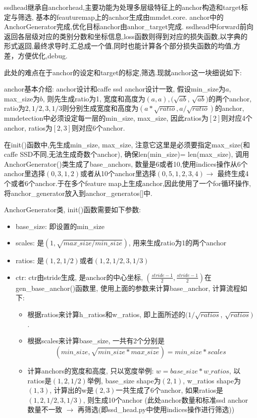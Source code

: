 \documentclass[UTF8]{ctexart}
\begin{document}
ssdhead继承自anchorhead,主要功能为处理多层级特征上的anchor构造和target标定与筛选,
基本的feauturemap上的acnhor生成由mmdet.core.
anchor中的AnchorGenerator完成,优化目标anchor由anhor\_target完成.
ssdhead中forward前向返回各层级对应的类别分数和坐标信息,loss函数则得到对应的损失函数,以字典的形式返回,最终求导时,汇总成一个值,同时也能计算各个部分损失函数的均值,方差，方便优化,debug.

此处的难点在于anchor的设定和target的标定,筛选.现就anchor这一块细说如下:

anchor基本介绍: anchor设计和caffe ssd anchor设计一致, 假设min\_size为$a$, max\_size为$b$, 则先生成ratio为1, 宽度和高度为$(a, a), (\sqrt{ab}$, 
$\sqrt{ab})$的两个anchor, ratio为$2, 1/2, 3, 1/3$则分别生成宽度和高度为$(a*\sqrt{ratio}, a/\sqrt{ratio})$的anchor, mmdetection中必须设定每一层的min\_size, max\_size, 因此ratios为$[2]$则对应4个anchor, ratios为$[2,3]$则对应6个anchor.

在init()函数中,先生成min\_size, max\_size, 注意它这里是必须要指定max\_size(和caffe SSD不同,无法生成奇数个anchor), 确保len(min\_size)=
len(max\_size), 调用AnchorGenerator()类生成了base\_anchors, 数量是6或者10,使用indices操作从6个anchor里选择$(0, 3, 1, 2)$或者从10个anchor里选择$(0, 5, 1, 2, 3, 4) $$\rightarrow$ 最终生成4个或者6个anchor.于在多个feature map上生成anchor,因此使用了一个for循环操作, 将anchor\_generator放入到anchor\_generatos[]中.


AnchorGenerator类, init()函数需要如下参数:

\begin{itemize}
	\item base\_size: 即设置的min\_size
	\item scales: 是$(1, \sqrt{max\_size / min\_size})$, 用来生成ratio为1的两个anchor
	\item ratios: 是$(1, 2, 1/2)$或者$(1, 2, 1/2, 3, 1/3)$
	\item ctr: ctr由stride生成, 是anchor的中心坐标, $(\frac{stride - 1}{2}, \frac{stride - 1}{2} ) $在gen\_base\_anchor()函数里, 使用上面的参数来计算base\_anchor, 计算流程如下:
	\begin{itemize}
		\item 根据ratios来计算h\_ratios和w\_ratios, 即上面所述的$(1 / \sqrt{ratios}$, $\sqrt{ratios}) $.
		\item 根据scales来计算base\_size, 一共有2个分别是$$(min\_size, \sqrt{min\_size * max\_size}) = min\_size * scales$$
		\item 计算anchors的宽度和高度, 只以宽度举例: $w = base\_size * w\_ratios$, 以ratios是$(1, 2, 1/2)$举例, base\_size shape为$(2, 1)$, w\_ratios shape为$(1, 3)$, 
		计算出的w是$(2, 3) $一共生成了6个anchor, 如果ratios是$(1, 2, 1/2, 3, 1/3)$, 则生成10个anchor (此处anchor数量和标准ssd anchor数量不一致 $\rightarrow$
		 再筛选(即ssd\_head.py中使用indices操作进行筛选))
	\end{itemize}
	
\end{itemize}
\end{document}
